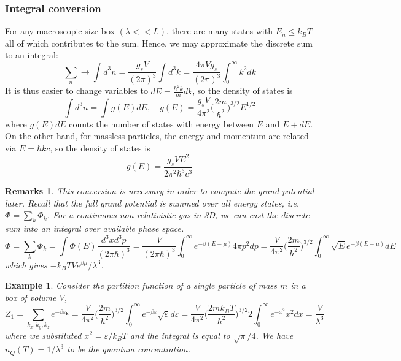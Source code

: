 \documentclass[a4paper]{article}
\newtheorem{eg}{Example}[section]
\newtheorem{remarks}{Remarks}[section]
\theoremstyle{new}
\begin{document}
\subsubsection*{Integral conversion}
For any macroscopic size box $(\lambda<<L)$, there are many states with $E_n\leq k_BT$ all of which contributes to the sum. Hence, we may approximate the discrete sum to an integral:
$$\sum_n\rightarrow\int d^3n=\frac{g_sV}{(2\pi)^3}\int d^3k=\frac{4\pi Vg_s}{(2\pi)^3}\int_0^\infty k^2dk$$
It is thus easier to change variables to $dE=\frac{\hbar^2k}{m}dk$, so the density of states is
\begin{equation}
\int d^3n=\int g(E)dE,\quad g(E)=\frac{g_sV}{4\pi^2}\bigg(\frac{2m}{\hbar^2}\bigg)^{3/2}E^{1/2}\label{DoS1}
\end{equation}
where $g(E)dE$ counts the number of states with energy between $E$ and $E+dE$. On the other hand, for massless particles, the energy and momentum are related via $E=\hbar kc$, so the density of states is
\begin{equation}
g(E)=\frac{g_sVE^2}{2\pi^2\hbar^3c^3}\label{DoS2}
\end{equation}
\begin{remarks}
This conversion is necessary in order to compute the grand potential later. Recall that the full grand potential is summed over all energy states, i.e. $\Phi=\sum_k\Phi_k$. For a continuous non-relativistic gas in 3D, we can cast the discrete sum into an integral over available phase space.
$$\Phi=\sum_k\Phi_k=\int\Phi(E)\frac{d^3xd^3p}{(2\pi\hbar)^3}=\frac{V}{(2\pi\hbar)^3}\int^\infty_0 e^{-\beta(E-\mu)}4\pi p^2dp=\frac{V}{4\pi^2}\bigg(\frac{2m}{\hbar^2}\bigg)^{3/2}\int_0^\infty\sqrt{E}e^{-\beta(E-\mu)}dE$$
which gives $-k_BTVe^{\beta\mu}/\lambda^3$. 
\end{remarks}
\begin{eg}
Consider the partition function of a single particle of mass $m$ in a box of volume $V$,
$$Z_1=\sum_{k_x,k_y,k_z}e^{-\beta\varepsilon_{\mathbf{k}}}=\frac{V}{4\pi^2}\bigg(\frac{2m}{\hbar^2}\bigg)^{3/2}\int_0^\infty e^{-\beta\varepsilon}\sqrt{\varepsilon}d\varepsilon=\frac{V}{4\pi^2}\bigg(\frac{2mk_BT}{\hbar^2}\bigg)^{3/2}2\int_0^\infty e^{-x^2}x^2dx=\frac{V}{\lambda^3}$$
where we substituted $x^2=\varepsilon/k_BT$ and the integral is equal to $\sqrt{\pi}/4$. We have $n_Q(T)=1/\lambda^3$ to be the quantum concentration.
\end{eg}

\newpage
\end{document}
